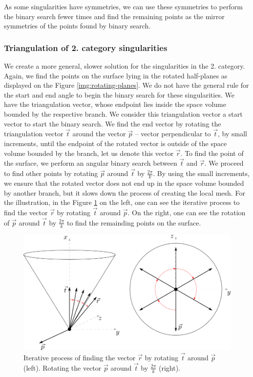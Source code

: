 As some singularities have symmetries, we can use these symmetries
to perform the binary search fewer times and find the remaining points
as the mirror symmetries of the points found by binary search.

\subsubsection*{Triangulation of 2. category singularities}
We create a more general, slower solution for the singularities in the 2. category.
Again, we find the points on the surface lying in the rotated half-planes
as displayed on the Figure \ref{img:rotating-planes}.
We do not have the general rule for the start 
and end angle to begin the binary search for these singularities. We have the triangulation vector,
whose endpoint lies inside the space volume bounded by the respective branch.
We consider this triangulation vector a start vector to start the binary 
search. We find the end vector by rotating the triangulation vector $\vec{t}$ 
around the vector $\vec{p}$ -- vector perpendicular to $\vec{t}$, by small increments, 
until the endpoint of the rotated vector is outside of the space volume bounded by the branch,
let us denote this vector $\vec{r}$.
To find the point of the surface, we perform an angular binary search between $\vec{t}$
and $\vec{r}$. We proceed to find other points by rotating $\vec{p}$
around $\vec{t}$ by $\frac{2\pi}{k}$.
By using the small increments, we ensure that the rotated vector does not end up in
the space volume bounded by another branch, but it slows down the process of creating
the local mesh.
For the illustration, in the Figure \ref{img:54} on the left, one can see the iterative
process to find the vector $\vec{r}$ by rotating $\vec{t}$ around $\vec{p}$.
On the right, one can see the rotation of $\vec{p}$ around $\vec{t}$ by 
$\frac{2\pi}{k}$ to find the remainding points on the surface.

\begin{figure}
    \centerline{\includegraphics[scale=0.5]{images/img54}}
    \caption[Triangulation of 2. category singularities]
    {Iterative process of finding the vector $\vec{r}$ 
    by rotating $\vec{t}$ around $\vec{p}$ (left).
    Rotating the vector $\vec{p}$ around $\vec{t}$ by 
    $\frac{2\pi}{k}$ (right).}
    \label{img:54}
\end{figure}

